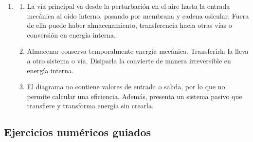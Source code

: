 \begin{enumerate}[label=\textbf{R\arabic*.},leftmargin=*]
    \item
    \begin{enumerate}[label=\alph*)]
        \item La vía principal va desde la perturbación en el aire hasta la
        entrada mecánica al oído interno, pasando por membrana y cadena
        osicular. Fuera de ella puede haber almacenamiento, transferencia hacia
        otras vías o conversión en energía interna.
        \item Almacenar conserva temporalmente energía mecánica. Transferirla la
        lleva a otro sistema o vía. Disiparla la convierte de manera
        irreversible en energía interna.
        \item El diagrama no contiene valores de entrada o salida, por lo que no
        permite calcular una eficiencia. Además, presenta un sistema pasivo que
        transfiere y transforma energía sin crearla.
    \end{enumerate}
\end{enumerate}

\subsection*{Ejercicios numéricos guiados}

